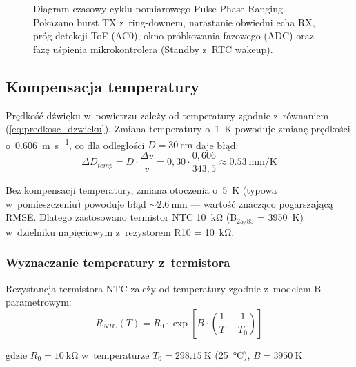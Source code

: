 \documentclass[a4paper,11pt]{article}
\begin{document}
\begin{figure}[H]
{%
    }
    \caption{Diagram czasowy cyklu pomiarowego Pulse-Phase Ranging. Pokazano burst
    TX z~ring-downem, narastanie obwiedni echa RX, próg detekcji ToF (AC0), okno
    próbkowania fazowego (ADC) oraz fazę uśpienia mikrokontrolera (Standby z~RTC wakeup).}
    \label{fig:diagram_czasowy}
\end{figure}

\subsection{Kompensacja temperatury}
\label{sec:temp_komp}

Prędkość dźwięku w~powietrzu zależy od temperatury zgodnie z~równaniem
(\ref{eq:predkosc_dzwieku}). Zmiana temperatury o~\SI{1}{\kelvin} powoduje
zmianę prędkości o~\SI{0,606}{\metre\per\second}, co dla odległości
$D = \SI{30}{\centi\metre}$ daje błąd:
\begin{equation}
    \Delta D_{temp} = D \cdot \frac{\Delta v}{v} = 0{,}30 \cdot \frac{0{,}606}{343{,}5} \approx \SI{0,53}{\milli\metre\per\kelvin}
    \label{eq:blad_temp}
\end{equation}

Bez kompensacji temperatury, zmiana otoczenia o~\SI{5}{\kelvin} (typowa
w~pomieszczeniu) powoduje błąd ${\sim}\SI{2,6}{\milli\metre}$ --- wartość
znacząco pogarszającą RMSE. Dlatego zastosowano termistor NTC \SI{10}{\kilo\ohm}
(B$_{25/85}$ = \SI{3950}{\kelvin}) w~dzielniku napięciowym z~rezystorem
R10 = \SI{10}{\kilo\ohm}.

\subsubsection{Wyznaczanie temperatury z~termistora}

Rezystancja termistora NTC zależy od temperatury zgodnie z~modelem
B-parametrowym:
\begin{equation}
    R_{NTC}(T) = R_0 \cdot \exp\!\left[B \cdot \left(\frac{1}{T} - \frac{1}{T_0}\right)\right]
    \label{eq:ntc_model}
\end{equation}

gdzie $R_0 = \SI{10}{\kilo\ohm}$ w~temperaturze $T_0 = \SI{298,15}{\kelvin}$
(\SI{25}{\celsius}), $B = \SI{3950}{\kelvin}$.
\end{document}
